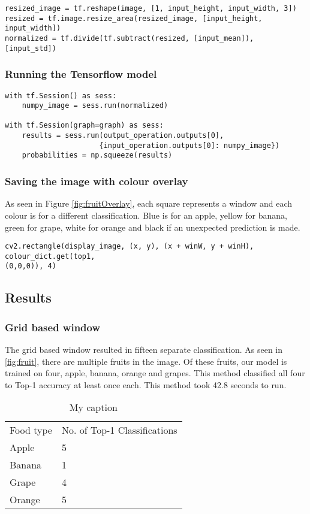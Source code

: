 \begin{lstlisting}
resized_image = tf.reshape(image, [1, input_height, input_width, 3])
resized = tf.image.resize_area(resized_image, [input_height, input_width])
normalized = tf.divide(tf.subtract(resized, [input_mean]), [input_std])
\end{lstlisting}

\subsubsection*{Running the Tensorflow model}
\begin{lstlisting}
with tf.Session() as sess:
	numpy_image = sess.run(normalized)

with tf.Session(graph=graph) as sess:
    results = sess.run(output_operation.outputs[0],
                      {input_operation.outputs[0]: numpy_image})
	probabilities = np.squeeze(results)
\end{lstlisting}

\subsubsection*{Saving the image with colour overlay}
As seen in Figure \ref{fig:fruitOverlay}, each square represents a window and
each colour is for a different classification. Blue is for an apple, yellow for
banana, green for grape, white for orange and black if an unexpected prediction
is made.

\begin{lstlisting}
cv2.rectangle(display_image, (x, y), (x + winW, y + winH), colour_dict.get(top1,
(0,0,0)), 4)
\end{lstlisting}

\subsection*{Results}
\subsubsection*{Grid based window}
The grid based window resulted in fifteen separate classification. As seen in
\ref{fig:fruit}, there are multiple fruits in the image. Of these fruits, our
model is trained on four, apple, banana, orange and grapes. This method
classified all four to Top-1 accuracy at least once each. This method took 42.8
seconds to run.

\begin{table}[]
	\centering
	\caption{My caption}
	\label{my-label}
	\begin{tabular}{ll}
		Food type & No. of Top-1 Classifications \\
		Apple     & 5                      \\
		Banana    & 1                      \\
		Grape     & 4                      \\
		Orange    & 5                     
	\end{tabular}
\end{table}

